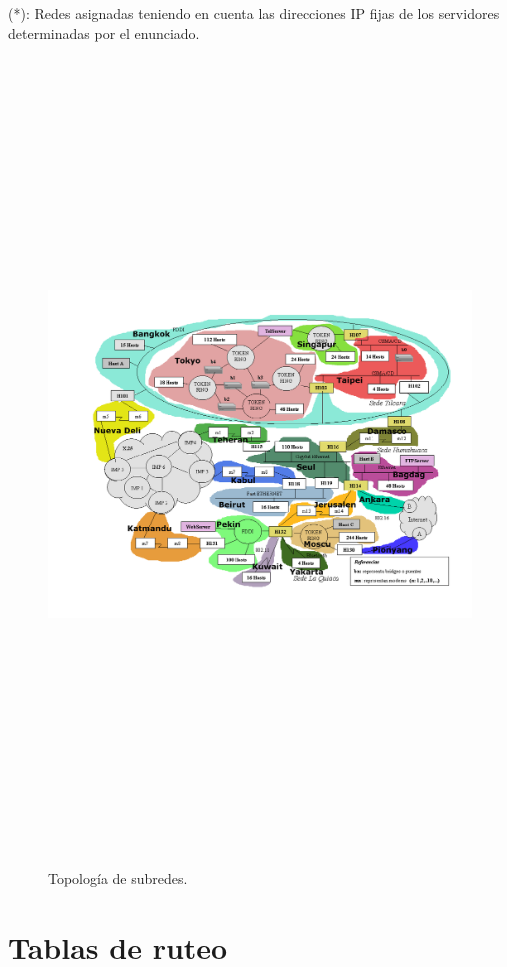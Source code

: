 \documentclass[12pt,titlepage]{article}
\begin{document}
(*): Redes asignadas teniendo en cuenta las direcciones IP fijas de los servidores determinadas por el enunciado. \\

\begin{figure}
  \begin{center}
    \advance\leftskip-3cm
    \includegraphics[width=22cm, height=21cm, angle=90]{Subneting.png} \\
  \end{center}
  \caption{Topología de subredes.}
\end{figure}
\FloatBarrier



\section{Tablas de ruteo}
\end{document}
